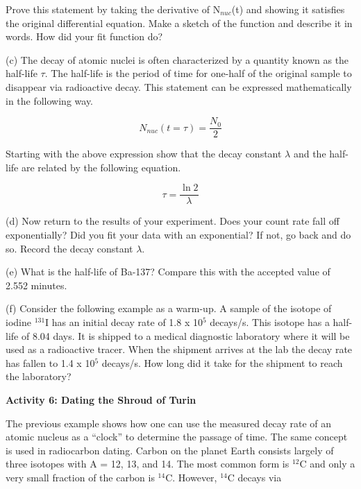 Prove this statement by taking the derivative of N\( _{nuc} \)(t)
and showing it satisfies the original differential equation. Make
a sketch of the function and describe it in words.
How did your fit function do?
\vspace{40mm}

(c) The decay of atomic nuclei is often characterized by a quantity
known as the half-life \( \tau  \). The half-life is the period of
time for one-half of the original sample to disappear via radioactive
decay. This statement can be expressed mathematically in the following
way.

\[
N_{nuc}(t=\tau )=\frac{N_{0}}{2}\]


Starting with the above expression show that the decay constant \( \lambda  \)
and the half-life are related by the following equation.

\[
\tau =\frac{\ln 2}{\lambda }\]


\vspace{2in}

(d) Now return to the results of your experiment.
Does your count rate fall off exponentially?
Did you fit your data with an exponential? If not,
go back and do so.
Record the decay constant $\lambda$.
\vspace{0.75in}

(e) What is the half-life of Ba-137? Compare this with the accepted value of 2.552 minutes.
\vspace{1.5in}

(f) Consider the following example as a warm-up. A sample of the isotope of iodine
\( ^{131} \)I has an initial decay rate of 1.8 x 10\( ^{5} \) decays/s.
This isotope has a half-life of 8.04 days. It is shipped to a medical
diagnostic laboratory where it will be used as a radioactive tracer.
When the shipment arrives at the lab the decay rate has fallen to
1.4 x 10\( ^{5} \) decays/s. How long did it take for the shipment
to reach the laboratory?
\vspace{2in}


\textbf{Activity 6: Dating the Shroud of Turin }

The previous example shows how one can use the measured decay rate
of an atomic nucleus as a {}``clock'' to determine the passage of
time. The same concept is used in radiocarbon dating. Carbon on the
planet Earth consists largely of three isotopes with A = 12, 13, and
14. The most common form is \( ^{12} \)C and only a very small fraction
of the carbon is \( ^{14} \)C. However, \( ^{14} \)C decays via 


